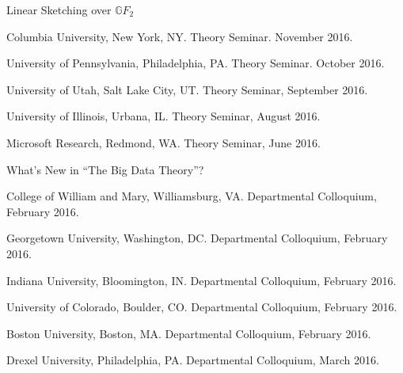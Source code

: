 \documentclass[11pt]{article}
\newenvironment{innerlist}[1][\enskip\textbullet]%
        {\begin{compactitem}[#1]}{\end{compactitem}}
\begin{document}
\begin{innerlist}
\item Linear Sketching over $\mathbb{G}F_2$
\begin{innerlist}
\item Columbia University, New York, NY. Theory Seminar. November 2016.
\item University of Pennsylvania, Philadelphia, PA. Theory Seminar. October 2016.
\item University of Utah, Salt Lake City, UT. Theory Seminar, September 2016.
\item University of Illinois, Urbana, IL. Theory Seminar, August 2016.
\item Microsoft Research, Redmond, WA. Theory Seminar, June 2016.
\end{innerlist}

\item What's New in ``The Big Data Theory''?
\begin{innerlist}
\item College of William and Mary, Williamsburg, VA. Departmental Colloquium, February 2016.
\item Georgetown University, Washington, DC. Departmental Colloquium, February 2016.
\item Indiana University, Bloomington, IN. Departmental Colloquium, February 2016.
\item University of Colorado, Boulder, CO. Departmental Colloquium, February 2016.
\item Boston University, Boston, MA. Departmental Colloquium, February 2016. 
\item Drexel University, Philadelphia, PA. Departmental Colloquium, March 2016.
\end{innerlist}
\end{innerlist}
\end{document}
